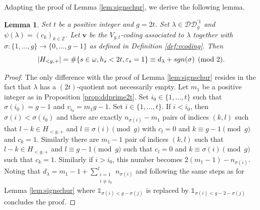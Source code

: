 \documentclass[11pt,letterpaper]{amsart}
\def\bbbz{\mathbb Z}
\def\ccdd{\mathcal {DD}}
\def\sgn{{\rm sgn}}
\newtheorem{lm}[df]{Lemma}
\DeclareMathOperator{\I}{I}
\numberwithin{equation}{section}
\numberwithin{df}{section}
\begin{document}
Adapting the proof of Lemma \ref{lem:signschur}, we derive the following lemma.
\begin{lm}\label{lem:signschurtypebv}
Set $t$ be a positive integer and $g=2t$.
Set $\lambda\in\ccdd_{g}^{'1}$ and $\psi(\lambda)=(c_k)_{k\in\bbbz}$. 
Let $\mathbf{v}$ be the $V_{g,t}$-coding associated to $\lambda$ together with $\sigma : \lbrace 1,\dots,g\rbrace\rightarrow \lbrace 0,\dots,g-1\rbrace$ as defined in Definition \ref{def:vcoding}. Then
\begin{equation}
\lvert H_{<g,+}\rvert=\#\lbrace s\in\omega, h_s<2t, \varepsilon_s=1\rbrace\equiv d_\lambda+\sgn(\sigma)\pmod{2}.
\end{equation}
\end{lm}

\begin{proof}
The only difference with the proof of Lemma \ref{lem:signschur} resides in the fact that $\lambda$ has a $(2t)$-quotient not necessarily empty. Let $m_1$ be a positive integer as in Proposition \ref{prop:ddprime2t}. Set $i_0\in\lbrace 1,\dots,t\rbrace$ such that $\sigma(i_0)=g-1$ and $v_{i_0}=m_1g-1$. Set $i\in\lbrace 1,\dots,t\rbrace$. If $i<i_0$, then $\sigma(i)<\sigma(i_0)$ and there are exactly $n_{\sigma(i)}-m_1$ pairs of indices $(k,l)$ such that $l-k\in H_{<g,+}$ and $l\equiv\sigma(i)\pmod{g}$ with $c_l=0$ and $k\equiv g-1\pmod{g}$ and $c_k=1$.
Similarly there are $m_1-1$ pair of indices $(k,l)$ such that $l-k\in H_{<g,+}$ and $l\equiv g-1\pmod{g}$ such that $c_l=0$ and $k\equiv \sigma(i)\pmod{g}$ such that $c_k=1$.
Similarly if $i>i_0$, this number becomes $2(m_1-1)-n_{\sigma(i)}$.
Noting that $d_\lambda=m_1-1+\sum_{\substack{i=1\\i\neq i_0}}^t n_{\sigma(i)}$ and following the same steps as for Lemma \ref{lem:signschur} where $\mathds{1}_{\sigma(i)<g-\sigma(j)}$ is replaced by $\mathds{1}_{\sigma(i)<g-2-\sigma(j)} $ concludes the proof.
\end{proof}
\end{document}
